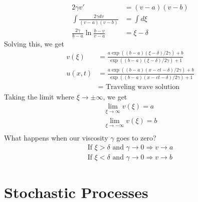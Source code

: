 \documentclass[12pt, letterpaper]{article}
\begin{document}
\begin{align*}
    2\gamma v' &= (v-a)(v-b) \\
    \int \frac{2\gamma dv}{(v-a)(v-b)} &= \int d\xi \\
    \frac{2\gamma}{b-a} \ln \frac{b-v}{v-a} &= \xi - \delta
\end{align*}
Solving this, we get 
\begin{align*}
    v(\xi) &= \frac{a\exp((b-a)(\xi-\delta)/2\gamma)+b}{\exp((b-a)(\xi-\delta)/2\gamma)+1} \\
    u(x,t) &= \frac{a\exp((b-a)(x-ct -\delta)/2\gamma)+b}{\exp((b-a)(x - ct -\delta)/2\gamma)+1} \\
    &= \text{ Traveling wave solution}
\end{align*}
Taking the limit where $\xi \rightarrow \pm \infty$, we get 
\begin{align*}
    \lim_{\xi \rightarrow \infty} v(\xi) = a \\
    \lim_{\xi \rightarrow -\infty} v(\xi) = b \\
\end{align*}
What happens when our viscosity $\gamma$ goes to zero? 
\begin{align*}
    \text{If } \xi > \delta \text{ and } \gamma \rightarrow 0 \Rightarrow v \rightarrow a \\
    \text{If } \xi < \delta \text{ and } \gamma \rightarrow 0 \Rightarrow v \rightarrow b 
\end{align*}
\section{Stochastic Processes}
\end{document}
